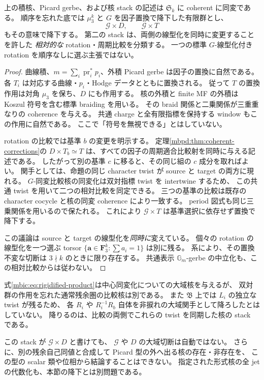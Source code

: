 \begin{proposition}
\label{mbic:prop:permutation}
上の積核、Picard gerbe、および核 stack の記述は
$\mathfrak S_k$ に coherent に同変である。
順序を忘れた底では $\mu_3^k$ と $G$ を因子置換で降下した有限群とし、
\[
 \mathscr G\times D,\qquad \mathscr G\times T
\]
もその意味で降下する。
第二の stack は、両側の線型化を同時に変更することを許した
\emph{相対的な} rotation・周期比較を分類する。
一つの標準 $G$-線型化付き rotation を順序なしに選ぶ主張ではない。
\end{proposition}
\begin{proof}
曲線積、$m=\sum_i\operatorname{pr}_i^*p_i$、外積 Picard gerbe は因子の置換に自然である。
各 $T_i$ は対応する曲線・$p_i$・Hodge データとともに置換される。
従って $T$ の置換作用は対角 $\mu_3$ を保ち、$D$ にも作用する。
核の外積と finite MF の外積は Koszul 符号を含む標準 braiding を用いる。
その braid 関係と二乗関係が三重重なりの coherence を与える。
共通 charge と全有限指標を保持する window もこの作用に自然である。
ここで「符号を無視できる」とはしていない。

rotation の比較では基準 $b$ の変更を明示する。
定理\ref{mbpd:thm:coherent-corrections}の
$D\times T_b\simeq T$ は、すべての因子の周期適合比較射を同時に与える記述である。
したがって別の基準 $c$ に移ると、その同じ組の $c$ 成分を取ればよい。
関手としては、命題の同じ character twist が
source と target の両方に現れる。
$G$-同変比較核の同変化は双対指標 twist を intertwine するため、
この共通 twist を用いて二つの相対比較を同定できる。
三つの基準の比較は既存の character cocycle と核の同変 coherence により一致する。
period 図式も同じ三乗関係を用いるので保たれる。
これにより $\mathscr G\times T$ は基準選択に依存せず置換で降下する。

この議論は source と target の線型化を\emph{同時に}変えている。
個々の rotation の線型化を一つ選ぶ torsor
$\{\boldsymbol a\in\mathbf F_3^k:\sum a_i=1\}$ は別に残る。
系により、その置換不変な切断は
$3\nmid k$ のときに限り存在する。
共通表示 $\mathbb G_m$-gerbe の中立化も、この相対比較からは従わない。
\end{proof}

\begin{remark}
\label{mbic:rem:scope}
式\eqref{mbic:eq:rigidified-product}は中心同変化についての大域核を与えるが、
双対群の作用を忘れた通常残余圏の比較核は別である。
また $\mathfrak B$ 上では $L_i$ の独立な twist が残るため、
各 $R_i$ や $R_i^{-1}R_b$ 自体を非捩れの大域関手として降ろしたとはしていない。
降りるのは、比較の両側でこれらの twist を同期した核の stack である。

この stack が $\mathscr G\times D$ と書けても、
$\mathscr G$ や $D$ の大域切断は自動ではない。
さらに、別の残余自己同値と合成して Picard 型の外へ出る核の存在・非存在を、
この型の scalar 類や位相から結論することはできない。
指定された形式核の全 jet の代数化も、本節の降下とは別問題である。
\end{remark}
